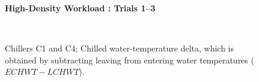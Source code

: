 \documentclass{report}
\begin{document}
\begin{figure}[!h]
\centerline{\bfseries\large High-Density Workload : Trials 1--3}\\
\caption{Chillers C1 and C4; Chilled water-temperature delta, which is obtained by subtracting leaving from entering water temperatures ($ECHWT-LCHWT$).}
\end{figure}
\end{document}

